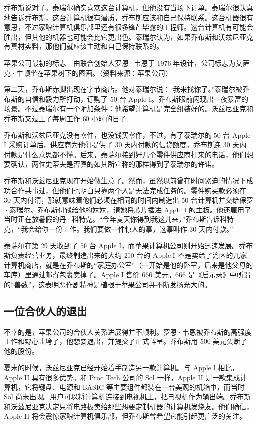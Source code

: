 \documentclass[12pt,UTF8]{ctexbook}
\begin{document}
乔布斯说对了。泰瑞尔确实喜欢这台计算机，但他没有当场下订单。泰瑞尔很认真地告诉乔布斯，这台计算机很有潜质，乔布斯应该和自己保持联系。这台机器很有意思，不过家酿计算机俱乐部里还有很多锋芒毕露的工程师。这台计算机有可能会胜出，但其他的机器也可能会比它更出色。泰瑞尔认为，如果乔布斯和沃兹尼亚克有真材实料，那他们就应该主动和自己保持联系的。



苹果公司最初的标志　由联合创始人罗恩·韦恩于 1976 年设计，公司标志为艾萨克·牛顿坐在苹果树下的图画。（资料来源：苹果公司）

第二天，乔布斯赤脚出现在字节商店。他对泰瑞尔说：“我来找你了。”泰瑞尔被乔布斯的自信和毅力所打动，订购了 50 台 Apple I。乔布斯眼前闪现出一夜暴富的场景。不过泰瑞尔有一个附加条件：他希望计算机是完全组装好的。沃兹尼亚克和乔布斯又过上了每周工作 60 小时的日子。

乔布斯和沃兹尼亚克没有零件，也没钱买零件，不过，有了泰瑞尔的 50 台 Apple I 采购订单后，供应商为他们提供了 30 天内付款的信贷额度。乔布斯连 30 天内付款是什么意思都不懂。后来，泰瑞尔接到好几个零件供应商打来的电话，他们想要确认，两位史蒂夫是否真的如其所宣称的那样得到了泰瑞尔的许诺。

乔布斯和沃兹尼亚克现在开始做生意了。然而，虽然以前曾在时间紧迫的情况下成功合作共事过，但他们也明白只靠两个人是无法完成任务的。零件购买款必须在 30 天内付清，那就意味着他们必须在相同的时间内制造出 50 台计算机并交给保罗·泰瑞尔。乔布斯付钱给他的妹妹，请她将芯片插进 Apple I 的主板。他还雇用了当时正在放暑假的丹·科特克。“今年夏天你得到我这儿来，”乔布斯告诉科特克，“我会给你一份工作。我们要做一件惊人的事，这事叫作 30 天内付款。”

泰瑞尔在第 29 天收到了 50 台 Apple I，而苹果计算机公司则开始迅速发展。乔布斯负责经营业务，最终制造出来的大约 200 台的 Apple I 不是卖给了湾区的几家计算机商店，就是在乔布斯的“家庭办公室”（一开始是他的卧室，后来是他父母的车库）里通过邮寄包裹卖掉了。Apple I 售价 666 美元，666 是《启示录》中所谓的“兽数”，这表明恶作剧精神是植根于苹果公司并不断发扬光大的。





\subsection{一位合伙人的退出}


不幸的是，苹果公司的合伙人关系进展得并不顺利。罗恩·韦恩被乔布斯的高强度工作和野心击垮了，他想要退出，并提交了正式辞呈。乔布斯用 500 美元买断了他的股份。

夏末的时候，沃兹尼亚克已经开始着手制造另一款计算机。与 Apple I 相比，Apple II 具有很多优势。和 Proc Tech 公司的 Sol 一样，Apple II 是一款集成计算机，它将键盘、电源和 BASIC 等主要组件都装在一台美观的机箱中，而当时 Sol 尚未出现。用户可以将计算机连接到电视机上，把电视机作为输出端。乔布斯和沃兹尼亚克决定只将电路板卖给那些想要定制机器的计算机发烧友。他们确信，Apple II 将会震惊家酿计算机俱乐部，但乔布斯曾希望它能引起更广泛的关注。
\end{document}
